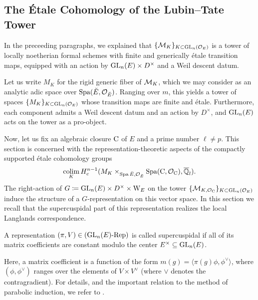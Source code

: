 \documentclass[../main.tex]{subfiles}
\begin{document}

\subsection{The \'Etale Cohomology of the Lubin--Tate Tower} %
\label{sub:The Local Langlands Correspondence for the General Linear Group}
In the preceeding paragraphs, we explained that $\{\mathcal{M}_{K}\}_{K \subset
\operatorname{GL}_n(\mathcal{O}_E)}$ is a 
tower of locally noetherian formal schemes with finite and generically \'etale 
transition maps, equipped with an action by $\operatorname{GL}_n(E) \times D^\times$ and 
a Weil descent datum. 

Let us write $M_{K}$ for the rigid generic fiber of $\mathcal{M}_{K}$,
which we may consider as an analytic adic space over $\operatorname{Spa}({\breve {E}},\mathcal{O}_{\breve {E}})$. 
Ranging over $m$, this yields a tower of spaces $\{M_{K}\}_{K \subset
\operatorname{GL}_n(\mathcal{O}_E)}$ whose transition maps are finite and \'etale. Furthermore, each
component admits a Weil descent datum and an action by $D^\times$, and $\operatorname{GL}_n(E)$
acts on the tower as a pro-object. 

Now, let us fix an algebraic closure ${\mathrm{C}}$ of $E$ and a prime number $\ell
\neq p$. This section is concerned with the representation-theoretic aspects of
the compactly supported \'etale cohomology groups
\begin{equation*}
  \operatorname*{colim}_K H^{n-1}_c (M_{K} \times_{\operatorname{Spa}{{\breve {E}},\mathcal{O}_{\breve {E}}}} \operatorname{Spa}({\mathrm{C}}, \mathcal{O}_{\mathrm{C}}), \overline {\mathbb{Q}}_l).
\end{equation*}
The right-action of $G \coloneqq \operatorname{GL}_n(E) \times D^\times \times \mathrm W_E$ on the tower
$\{\mathcal{M}_{K, \mathcal{O}_{\mathrm{C}}}\}_{K \subset \operatorname{GL}_n(\mathcal{O}_E)}$ induce the structure of a
$G$-representation on this vector space. 
In this section we recall that the supercuspidal part of this representation
realizes the local Langlands correspondence. 

\begin{defi}\label{def:SuperCusp}
  A representation $(\pi,V) \in {({\operatorname{GL}_n(E)}\text-\allowbreak\mathrm{Rep})}$ is called supercuspidal if all
  of its matrix coefficients are constant modulo the center $E^\times \subseteq
  \operatorname{GL}_n(E)$.
\end{defi}
Here, a matrix coefficient is a function of the form $m(g) = \langle \pi(g)
\phi, \phi^\vee\rangle$, where $(\phi, \phi^\vee)$ ranges over the elements of
$V \times V^\vee$ (where $\vee$ denotes the contragradient). For details, and
the important relation to the method of parabolic induction, we refer to
\cite[Section 8]{getz2023introduction}.
\end{document}
